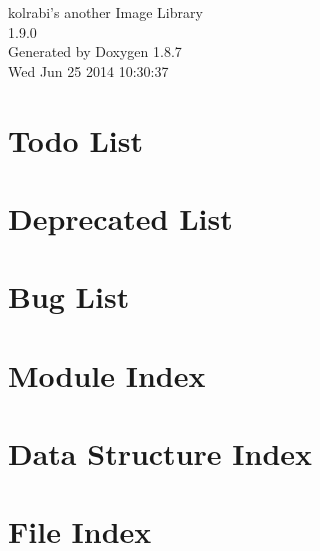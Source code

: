 \documentclass[twoside]{book}
\newcommand{\+}{\discretionary{\mbox{\scriptsize$\hookleftarrow$}}{}{}}
\newcommand{\clearemptydoublepage}{%
  \newpage{\pagestyle{empty}\cleardoublepage}%
}
\begin{document}
\hypersetup{pageanchor=false,
             bookmarks=true,
             bookmarksnumbered=true,
             pdfencoding=unicode
            }
\begin{titlepage}
\vspace*{7cm}
\begin{center}%
{\Large kolrabi's another Image Library \\[1ex]\large 1.\+9.\+0 }\\
\vspace*{1cm}
{\large Generated by Doxygen 1.8.7}\\
\vspace*{0.5cm}
{\small Wed Jun 25 2014 10:30:37}\\
\end{center}
\end{titlepage}
\clearemptydoublepage
\tableofcontents
\clearemptydoublepage
{}
\hypersetup{pageanchor=true}

\chapter{Todo List}
\label{dd/da0/todo}
\hypertarget{dd/da0/todo}{}

\chapter{Deprecated List}
\label{da/d58/deprecated}
\hypertarget{da/d58/deprecated}{}

\chapter{Bug List}
\label{de/da5/bug}
\hypertarget{de/da5/bug}{}

\chapter{Module Index}

\chapter{Data Structure Index}

\chapter{File Index}

\end{document}
